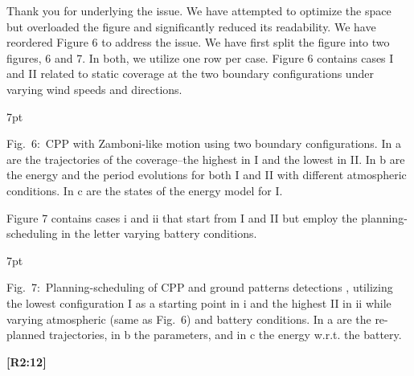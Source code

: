 \documentclass[10pt]{letter}
\newenvironment{formal}{%
  \def\FrameCommand{%
    \hspace{1pt}%
    {\color{red}\vrule width 2pt}%
    {\color{formalshade}\vrule width 4pt}%
    \colorbox{formalshade}%
  }%
  \MakeFramed{\advance\hsize-\width\FrameRestore}%
  \noindent\hspace{-4.55pt}%
  \begin{adjustwidth}{}{7pt}%
  \vspace{2pt}\vspace{2pt}%
}
{%
  \vspace{2pt}\end{adjustwidth}\endMakeFramed%
}
\begin{document}
{\color{blue} 

{\hspace*{-4.5em}{[R2:11]}\vspace*{-1.9em}}

Thank you for underlying the issue. We have attempted to optimize the space but overloaded the figure and significantly reduced its readability. We have reordered Figure 6 to address the issue. We have first split the figure into two figures, 6 and 7. In both, we utilize one row per case. Figure 6 contains cases I and II related to static coverage at the two boundary configurations under varying wind speeds and directions.


\begin{formal}
  \footnotesize
  
  {\color{blue}Fig.~6:~\color{blue}CPP with Zamboni-like motion using two boundary configurations. In {\color{red}a} are the trajectories of the coverage--the highest in {\color{red}I} and the lowest in {\color{red}II}. In {\color{red}b} are the energy and the period evolutions for both {\color{red}I} and {\color{red}II} with different atmospheric conditions. In {\color{red}c} are the states of the energy model for {\color{red}I}.}
  \vspace*{1ex}
\end{formal}

Figure 7 contains cases i and ii that start from I and II but employ the planning-scheduling in the letter varying battery conditions. 

\begin{formal}
  \footnotesize
  
  \vspace*{-.6ex}
  {\color{blue}
  Fig.~7:~Planning-scheduling of CPP and ground patterns detections%
  , utilizing the lowest configuration {\color{red}I} as a starting point in {\color{red}i} and the highest {\color{red}II} in {\color{red}ii} while varying atmospheric (same as Fig.~{\color{red}6}) and battery conditions. In {\color{red}a} are the re-planned trajectories, in {\color{red}b} the parameters, and in {\color{red}c} the energy w.r.t. the battery.}
  \vspace*{1ex}
\end{formal}
}

\vspace*{2em}

{\hspace*{-4.5em}\textbf{[R2:12]}\vspace*{-1.9em}}
\end{document}
